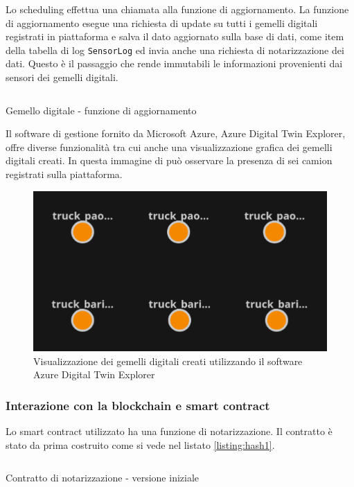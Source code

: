 \documentclass[a4paper,11pt]{article}
\newenvironment{longlisting}{\captionsetup{type=figure,labelformat=custom}}{}
\begin{document}
Lo scheduling effettua una chiamata alla funzione di aggiornamento. La funzione di aggiornamento esegue una richiesta di update su tutti i gemelli digitali registrati in piattaforma e salva il dato aggiornato sulla base di dati, come item della tabella di log \texttt{SensorLog} ed invia anche una richiesta di notarizzazione dei dati. Questo è il passaggio che rende immutabili le informazioni provenienti dai sensori dei gemelli digitali.

\begin{longlisting}
  \inputminted{java}{./code/dt.update.java}
  \caption{Gemello digitale - funzione di aggiornamento}
  \label{listing:dt5}
\end{longlisting}

Il software di gestione fornito da Microsoft Azure, Azure Digital Twin Explorer, offre diverse funzionalità tra cui anche una visualizzazione grafica dei gemelli digitali creati. In questa immagine di può osservare la presenza di sei camion registrati sulla piattaforma.

\begin{figure}[H]
  \centering
  \includegraphics[width=0.5\linewidth]{img/dt_explorer.png}
  \caption{Visualizzazione dei gemelli digitali creati utilizzando il software Azure Digital Twin Explorer }
  \label{fig:azureexplorer}
\end{figure}



\subsubsection{Interazione con la blockchain e smart contract}

Lo smart contract utilizzato ha una funzione di notarizzazione. Il contratto è stato da prima costruito come si vede nel listato \ref{listing:hash1}.

\begin{listing}[H]
  \inputminted{solidity}{./code/Hash.v1.sol}
  \caption{Contratto di notarizzazione - versione iniziale}
  \label{listing:hash1}
\end{listing}
\end{document}
